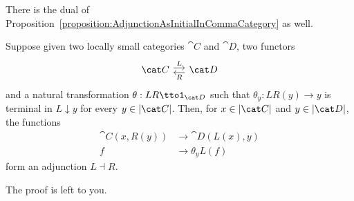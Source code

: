 %

There is the dual of Proposition~\ref{proposition:AdjunctionAsInitialInCommaCategory} as well.

\begin{proposition}\label{proposition:AdjunctionAsTerminalInCommaCategory}
Suppose given two locally small categories \(\cat C\) and \(\cat D\), two functors
\[\begin{tikzcd}[column sep=small]
\cat C \ar["L", r, shift left] & \cat D \ar["R", l, shift left]
\end{tikzcd}\]
and a natural transformation \(\theta : LR \tto \id_{\cat D}\) such that \(\theta_y : LR(y) \to y\) is terminal in \(L {\downarrow} y\) for every \(y \in \obj{\cat C}\).  Then, for \(x \in \obj{\cat C}\) and \(y \in \obj{\cat D}\), the functions
\begin{align*}
\cat C(x, R(y)) & \to \cat D(L(x), y) \\
f &\to \theta_y L(f)
\end{align*}
form an adjunction \(L \dashv R\).
\end{proposition}

\begin{exercise}
The proof is left to you.
\end{exercise}

